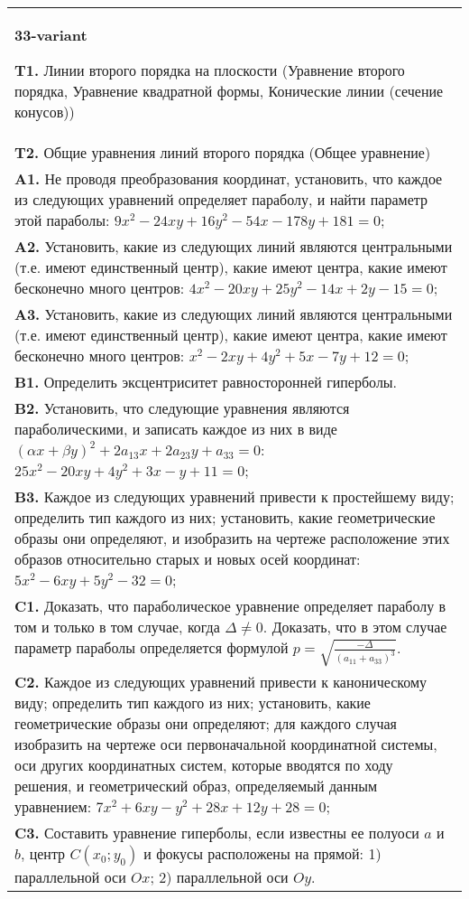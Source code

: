\documentclass{article}
\begin{document}
\begin{tabular}{m{17cm}}
\textbf{33-variant}
\newline

\textbf{T1.} Линии второго порядка на плоскости (Уравнение второго порядка, Уравнение квадратной формы, Конические линии (сечение конусов)) \\
\textbf{T2.} Общие уравнения линий второго порядка (Общее уравнение) \\
\textbf{A1.} Не проводя преобразования координат, установить, что каждое из следующих уравнений определяет параболу, и найти параметр этой параболы: $9 x^2-24 x y+16 y^2-54 x-178 y+181=0$; \\
\textbf{A2.} Установить, какие из следующих линий являются центральными (т.е. имеют единственный центр), какие имеют центра, какие имеют бесконечно много центров: $4 x^2-20 x y+25 y^2-14 x+2 y-15=0$; \\
\textbf{A3.} Установить, какие из следующих линий являются центральными (т.е. имеют единственный центр), какие имеют центра, какие имеют бесконечно много центров: $x^2-2 x y+4 y^2+5 x-7 y+12=0$; \\
\textbf{B1.} Определить эксцентриситет равносторонней гиперболы. \\
\textbf{B2.} Установить, что следующие уравнения являются параболическими, и записать каждое из них в виде $(\alpha x+\beta y)^2+2 a_{13} x+2 a_{23} y+a_{33}=0$: $25 x^2-20 x y+4 y^2+3 x-y+11=0$; \\
\textbf{B3.} Каждое из следующих уравнений привести к простейшему виду; определить тип каждого из них; установить, какие геометрические образы они определяют, и изобразить на чертеже расположение этих образов относительно старых и новых осей координат: $5 x^2-6 x y+5 y^2-32=0$; \\
\textbf{C1.} Доказать, что параболическое уравнение определяет параболу в том и только в том случае, когда $\Delta \neq 0$. Доказать, что в этом случае параметр параболы определяется формулой $p=\sqrt{\frac{-\Delta}{ (a_{11}+a_{33}) ^3}}$. \\
\textbf{C2.} Каждое из следующих уравнений привести к каноническому виду; определить тип каждого из них; установить, какие геометрические образы они определяют; для каждого случая изобразить на чертеже оси первоначальной координатной системы, оси других координатных систем, которые вводятся по ходу решения, и геометрический образ, определяемый данным уравнением: $7 x^2+6 x y-y^2+28 x+12 y+28=0$; \\
\textbf{C3.} Составить уравнение гиперболы, если известны ее полуоси $a$ и $b$, центр $C\left(x_0 ; y_0\right)$ и фокусы расположены на прямой: 1) параллельной оси $O x$; 2) параллельной оси $O y$. \\

\end{tabular}
\vspace{1cm}
\end{document}
